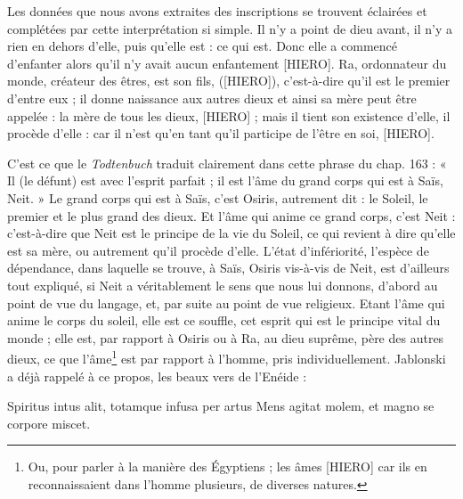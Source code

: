 \documentclass[a4paper, 11pt, oneside]{article}
\begin{document}
Les données que nous avons extraites des inscriptions se trouvent éclairées et complétées par cette interprétation si simple. Il n'y a point de dieu avant, il n'y a rien en dehors d'elle, puis qu'elle est : ce qui est. Donc elle a commencé d'enfanter alors qu'il n'y avait aucun enfantement [HIERO]. Ra, ordonnateur du monde, créateur des êtres, est son fils, ([HIERO]), c'est-à-dire qu'il est le premier d'entre eux ; il donne naissance aux autres dieux et ainsi sa mère peut être appelée : la mère de tous les dieux, [HIERO] ; mais il tient son existence d'elle, il procède d'elle : car il n'est qu'en tant qu'il participe de l'être en soi, [HIERO].

C'est ce que le \emph{Todtenbuch} traduit clairement dans cette phrase du chap. 163 : « Il (le défunt) est avec l'esprit parfait ; il est l'âme du grand corps qui est à Saïs, Neit. » Le grand corps qui est à Saïs, c'est Osiris, autrement dit : le Soleil, le premier et le plus grand des dieux. Et l'âme qui anime ce grand corps, c'est Neit : c'est-à-dire que Neit est le principe de la vie du Soleil, ce qui revient à dire qu'elle est sa mère, ou autrement qu'il procède d'elle. L'état d'infériorité, l'espèce de dépendance, dans laquelle se trouve, à Saïs, Osiris vis-à-vis de Neit, est d'ailleurs tout expliqué, si Neit a véritablement le sens que nous lui donnons, d'abord au point de vue du langage, et, par suite au point de vue religieux. Etant l'âme qui anime le corps du soleil, elle est ce souffle, cet esprit qui est le principe vital du monde ; elle est, par rapport à Osiris ou à Ra, au dieu suprême, père des autres dieux, ce que l'âme\footnote{Ou, pour parler à la manière des Égyptiens ; les âmes [HIERO] car ils en reconnaissaient dans l'homme plusieurs, de diverses natures.} est par rapport à l'homme, pris individuellement. Jablonski a déjà rappelé à ce propos, les beaux vers de l'Enéide :

Spiritus intus alit, totamque infusa per artus Mens agitat molem, et magno se corpore miscet.
\end{document}

